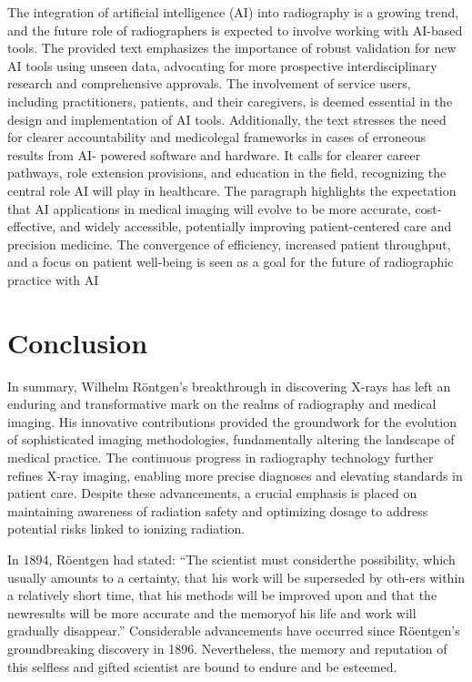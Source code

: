 \documentclass[a4paper,12pt]{report}
\begin{document}
The integration of artificial intelligence (AI) into radiography is a growing trend, and the
future role of radiographers is expected to involve working with AI-based tools. The provided
text emphasizes the importance of robust validation for new AI tools using unseen data,
advocating for more prospective interdisciplinary research and comprehensive approvals. The
involvement of service users, including practitioners, patients, and their caregivers, is deemed
essential in the design and implementation of AI tools. Additionally, the text stresses the need
for clearer accountability and medicolegal frameworks in cases of erroneous results from AI-
powered software and hardware. It calls for clearer career pathways, role extension provisions,
and education in the field, recognizing the central role AI will play in healthcare. The paragraph
highlights the expectation that AI applications in medical imaging will evolve to be more
accurate, cost-effective, and widely accessible, potentially improving patient-centered care and
precision medicine. The convergence of efficiency, increased patient throughput, and a focus
on patient well-being is seen as a goal for the future of radiographic practice with AI

\chapter{Conclusion}

In summary, Wilhelm Röntgen's breakthrough in discovering X-rays has left an enduring and
transformative mark on the realms of radiography and medical imaging. His innovative
contributions provided the groundwork for the evolution of sophisticated imaging
methodologies, fundamentally altering the landscape of medical practice. The continuous
progress in radiography technology further refines X-ray imaging, enabling more precise
diagnoses and elevating standards in patient care. Despite these advancements, a crucial
emphasis is placed on maintaining awareness of radiation safety and optimizing dosage to
address potential risks linked to ionizing radiation.

In 1894, Röentgen had stated: “The scientist must considerthe possibility, which usually amounts
to a certainty, that his work will be superseded by oth-ers within a relatively short time, that his
methods will be improved upon and that the newresults will be more accurate and the memoryof his
life and work will gradually disappear.” Considerable advancements have occurred since
Röentgen's groundbreaking discovery in 1896. Nevertheless, the memory and reputation of this
selfless and gifted scientist are bound to endure and be esteemed.


\printbibheading

\printbibliography[type=book,heading=subbibliography,title={Books}]
\printbibliography[type=article, heading=subbibliography, title={Articles}]
\printbibliography[type=online,heading=subbibliography, title={Online Resources}]
\printbibliography[type=misc, heading=subbibliography, title={Other Documents}]
\end{document}
